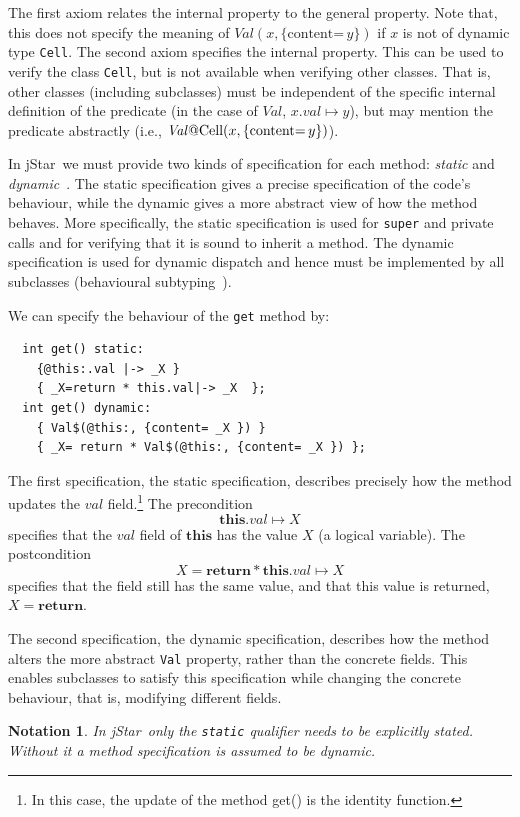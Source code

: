 \documentclass[11pt]{article}
\newcommand{\jStar}{{\sf jStar}}
\newcommand{\Val}{\mathit{Val}}
\newcommand{\content}[1]{\{\text{content=} \, #1 \}}
\newcommand{\this}{\mathbf{this}}
\newcommand{\return}{\mathbf{return}}
\newtheorem{notation}{Notation}
\def\J{\lstinline}
\newcommand{\JS}[1]{$\mathit{#1}$}
\begin{document}
The first axiom relates the internal property to the general property.  Note
that, this does not specify the meaning of $\Val(x,\content y)$ if $x$
is not of dynamic type \J~Cell~.  The second axiom specifies the internal
property.  This can be used to verify the class  \J~Cell~, but is not available
when verifying other classes.  That is, other classes (including
subclasses) must be independent of the specific internal definition of
the predicate (in the case of $\Val$, $ x.val \mapsto y$),
 but may mention the predicate abstractly (i.e., $\Val\J~@Cell~(x,\content y)$).



In \jStar \ we must provide two kinds of specification for each method: {\em static}
and {\em dynamic}~\cite{PB:popl08,chin08}.  The static specification gives a precise specification of the code's behaviour, while the
dynamic gives a more abstract view of how the method
behaves.  More specifically, the static specification is used for
\J~super~ and private calls and for verifying that it is sound to inherit a
method.  The dynamic specification is used for dynamic dispatch
and hence must be implemented by all subclasses (behavioural
subtyping~\cite{liskov94}).

We can specify the behaviour of the \J~get~ method by:
\begin{verbatim}
  int get() static:
    {@this:.val |-> _X }
    { _X=return * this.val|-> _X  };
  int get() dynamic:
    { Val$(@this:, {content= _X }) } 
    { _X= return * Val$(@this:, {content= _X }) };
\end{verbatim}
%
The first specification, the static specification, describes precisely
how the method updates the \JS{val} field.\footnote{In this case, the
  update of the method get() is the identity function.}  The
precondition $$\this.val \mapsto X$$ specifies that the \JS{val}
field of $\this$ has the value \JS{X} (a logical
variable). 
The postcondition $$X=\return * \this.val \mapsto X$$  specifies that the
field still has the same value, and that this value is returned,
$X=\return$.

The second specification, the dynamic specification, describes how the
method alters the more abstract \J~Val~ property, rather than the
concrete fields.  This enables subclasses to satisfy this
specification while changing the concrete behaviour, that is,
modifying different fields.

\begin{notation}
In \jStar \ only the {\tt static}
  qualifier needs to be explicitly stated. Without it 
  a method specification is assumed to be dynamic.
\end{notation}
\end{document}
